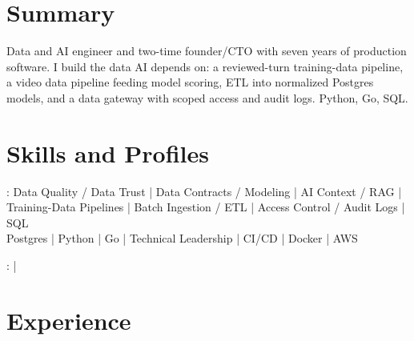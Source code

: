\documentclass[print]{jack-resume}
\begin{document}
\pagecolor{darkmodeBackground}


\begin{minipage}[t][1cm][t]{.03\textwidth}
    \hfill
\end{minipage}

\section{Summary}
Data and AI engineer and two-time founder/CTO with seven years of production software. I build the data AI depends on: a reviewed-turn training-data pipeline, a video data pipeline feeding model scoring, ETL into normalized Postgres models, and a data gateway with scoped access and audit logs. Python, Go, SQL.
\sectionsep

\section{Skills and Profiles}
:
Data Quality / Data Trust \hfill | \hfill
Data Contracts / Modeling \hfill | \hfill
AI Context / RAG \hfill | \hfill
Training-Data Pipelines \hfill | \hfill
Batch Ingestion / ETL \hfill | \hfill
Access Control / Audit Logs \hfill | \hfill
SQL \\
\hspace{1.0cm} Postgres \hfill | \hfill
Python \hfill | \hfill
Go \hfill | \hfill
Technical Leadership \hfill | \hfill
CI/CD \hfill | \hfill
Docker \hfill | \hfill
AWS \\

\raggedright{
    :
      \href{https://www.linkedin.com/in/jack-sturtevant/}{ \ExternalLink} |
     \href{https://github.com/jacksturt}{ \ExternalLink}}

\section{Experience}
\end{document}
